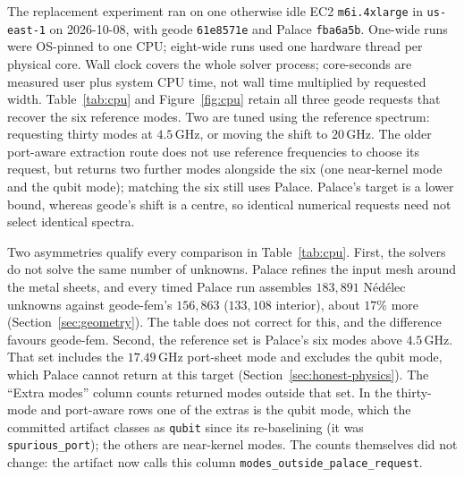 \documentclass{anvil-paper}
\begin{document}
The replacement experiment ran on one otherwise idle EC2
\texttt{m6i.4xlarge} in \texttt{us-east-1} on 2026-10-08, with geode
\texttt{61e8571e} and Palace \texttt{fba6a5b}. One-wide runs were
OS-pinned to one CPU; eight-wide runs used one hardware thread per
physical core. Wall clock covers the whole solver process; core-seconds
are measured user plus system CPU time, not wall time multiplied by
requested width. Table~\ref{tab:cpu} and Figure~\ref{fig:cpu} retain all three geode requests
that recover the six reference modes. Two are tuned using the reference
spectrum: requesting thirty modes at $4.5$\,GHz, or moving the shift to
$20$\,GHz. The older port-aware extraction route does not use reference
frequencies to choose its request, but returns two further modes
alongside the six (one near-kernel mode and the qubit mode); matching
the six still uses Palace.
Palace's target is a lower bound, whereas geode's shift is a centre, so
identical numerical requests need not select identical spectra.

Two asymmetries qualify every comparison in Table~\ref{tab:cpu}. First,
the solvers do not solve the same number of unknowns. Palace refines
the input mesh around the metal sheets, and every timed Palace run
assembles $183{,}891$ N\'ed\'elec unknowns against geode-fem's
$156{,}863$ ($133{,}108$ interior), about $17\%$ more
(Section~\ref{sec:geometry}). The table does not correct for this, and
the difference favours geode-fem. Second, the reference set is Palace's
six modes above $4.5$\,GHz. That set includes the $17.49$\,GHz
port-sheet mode and excludes the qubit mode, which Palace cannot return
at this target (Section~\ref{sec:honest-physics}). The ``Extra modes''
column counts returned modes outside that set. In the thirty-mode and
port-aware rows one of the extras is the qubit mode, which the committed
artifact classes as \texttt{qubit} since its re-baselining (it was
\texttt{spurious\_port}); the others are near-kernel modes. The counts
themselves did not change: the artifact now calls this column
\texttt{modes\_outside\_palace\_request}.
\end{document}
